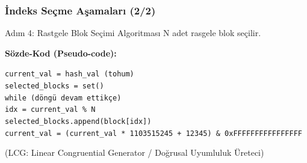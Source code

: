 \documentclass[aspectratio=169,xcolor={dvipsnames}]{beamer}
\begin{document}
\begin{frame}
  \frametitle{İndeks Seçme Aşamaları (2/2)}
  
  \begin{block}{Adım 4: Rastgele Blok Seçimi Algoritması}
    N adet rasgele blok seçilir.
    
    \vfill
    
    
    \textbf{Sözde-Kod (Pseudo-code):}
    
    \texttt{current\_val = hash\_val (tohum)} \\
    \texttt{selected\_blocks = set()} \\
    \texttt{while (döngü devam ettikçe)} \\
    \hspace{1cm} \texttt{idx = current\_val \% N} \\
    \hspace{1cm} \texttt{selected\_blocks.append(block[idx])} \\
    \hspace{1cm} \texttt{current\_val = (current\_val * 1103515245 + 12345) \& 0xFFFFFFFFFFFFFFFF}
    
    \vfill
    (LCG: Linear Congruential Generator / Doğrusal Uyumluluk Üreteci)
    
  \end{block}
  
  
\end{frame}
\end{document}
